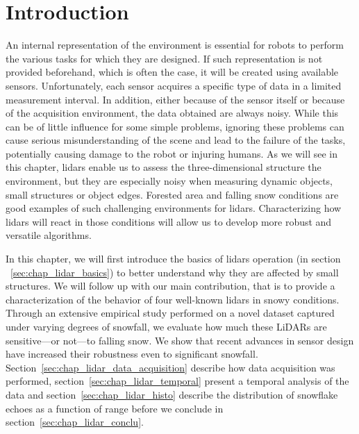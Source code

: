 \section{Introduction}
\label{sec:chap_lidar_intro}

An internal representation of the environment is essential for robots to perform the various tasks for which they are designed. If such representation is not provided beforehand, which is often the case, it will be created using available sensors. Unfortunately, each sensor acquires a specific type of data in a limited measurement interval. In addition, either because of the sensor itself or because of the acquisition environment, the data obtained are always noisy. While this can be of little influence for some simple problems, ignoring these problems can cause serious misunderstanding of the scene and lead to the failure of the tasks, potentially causing damage to the robot or injuring humans. As we will see in this chapter, \gls*{lidar}s enable us to assess the three-dimensional structure the environment, but they are especially noisy when measuring dynamic objects, small structures or object edges. Forested area and falling snow conditions are good examples of such challenging environments for \gls*{lidar}s. Characterizing how \gls*{lidar}s will react in those conditions will allow us to develop more robust and versatile algorithms.

In this chapter, we will first introduce the basics of \gls*{lidar}s operation (in section ~\ref{sec:chap_lidar_basics}) to better understand why they are affected by small structures. We will follow up with our main contribution, that is to provide a characterization of the behavior of four well-known \gls*{lidar}s in snowy conditions. Through an extensive empirical study performed on a novel dataset captured under varying degrees of snowfall, we evaluate how much these LiDARs are sensitive---or not---to falling snow. We show that recent advances in sensor design have increased their robustness even to significant snowfall. Section~\ref{sec:chap_lidar_data_acquisition} describe how data acquisition was performed, section~\ref{sec:chap_lidar_temporal} present a temporal analysis of the data and section~\ref{sec:chap_lidar_histo} describe the distribution of snowflake echoes as a function of range before we conclude in section~\ref{sec:chap_lidar_conclu}. 

